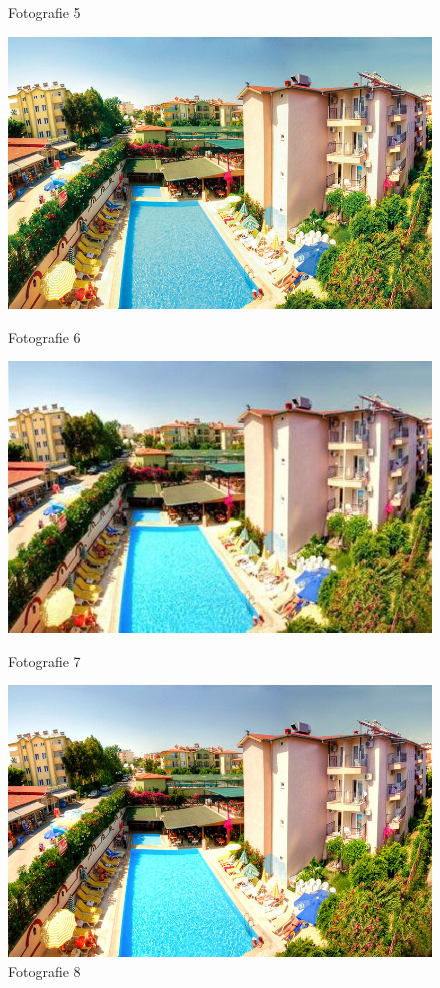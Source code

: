 \begin{figure}[!htb]
	\caption{Fotografie 5}\label{fig:img05}
	\endminipage\hfill
	\includegraphics[width=\linewidth]{graphics/kop/aa06.png}
	\caption{Fotografie 6}\label{fig:img06}
	\endminipage\hfill
	\includegraphics[width=\linewidth]{graphics/kop/aa07.png}
	\caption{Fotografie 7}\label{fig:img07}
	\endminipage\hfill
	\includegraphics[width=\linewidth]{graphics/kop/aa08.png}
	\caption{Fotografie 8}\label{fig:img08}
	\endminipage\hfill
\end{figure}

